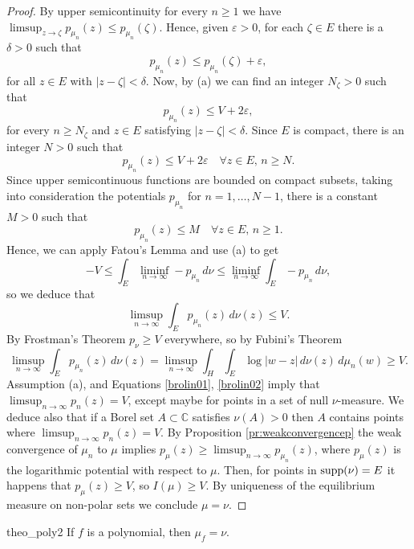 \begin{proof}

By upper semicontinuity for every $n\geq 1$ we have $\limsup_{z\rightarrow \zeta} p_{\mu_n}(z)\leq p_{\mu_n}(\zeta)$. Hence, given $\varepsilon>0$, for each $\zeta\in E$ there is a $\delta>0$ such that 
$$p_{\mu_n}(z) \leq p_{\mu_n}(\zeta)+\varepsilon,$$
for all $z\in E$ with $|z-\zeta|<\delta$. Now, by (a) we can find an integer $N_\zeta>0$ such that 
$$p_{\mu_n}(z) \leq V + 2\varepsilon,$$
for every $n\geq N_\zeta$ and $z\in E$ satisfying $|z-\zeta|<\delta$. Since $E$ is compact, there is an integer $N>0$ such that
$$p_{\mu_n}(z) \leq V + 2\varepsilon \quad \forall z\in E, \, n\geq N.$$
Since upper semicontinuous functions are bounded on compact subsets, taking into consideration the potentials $p_{\mu_n}$ for $n=1,\dots,N-1$, there is a constant $M>0$ such that
$$p_{\mu_n}(z) \leq M \quad \forall z\in E, \, n\geq 1.$$
Hence, we can apply Fatou's Lemma and use (a) to get
$$-V \leq \int_E \liminf_{n\rightarrow \infty} - p_{\mu_n}\,d\nu \leq \liminf_{n\rightarrow \infty} \int_E -p_{\mu_n}\,d\nu,$$
so we deduce that
\begin{equation}\label{brolin01}
\limsup_{n\rightarrow \infty} \int_E p_{\mu_n}(z)\,d\nu(z) \leq V.
\end{equation}
By Frostman's Theorem $p_\nu \geq V$ everywhere, so by Fubini's Theorem  
\begin{equation}\label{brolin02}
\limsup_{n\rightarrow \infty} \int_E p_{\mu_n}(z)\, d\nu(z) = \limsup_{n\rightarrow \infty} \int_H \int_E \log|w-z|\,d\nu(z) \,d\mu_n(w) \geq V.
\end{equation}
Assumption (a), and Equations \eqref{brolin01}, \eqref{brolin02} imply that $\limsup_{n\rightarrow \infty} p_n(z)=V$, except maybe for points in a set of null $\nu$-measure. We deduce also that if a Borel set $A\subset \mathbb{C}$ satisfies $\nu(A)>0$ then $A$ contains points where $\limsup_{n\rightarrow \infty} p_n(z)=V$. By Proposition \ref{pr:weakconvergencep} the weak convergence of $\mu_n$ to $\mu$ implies $p_\mu (z) \geq \limsup_{n\rightarrow \infty} p_{\mu_n}(z)$, where $p_\mu(z)$ is the logarithmic potential with respect to $\mu$. Then, for points in $\text{supp}(\nu)=E$ it happens that $p_\mu(z)\geq V$, so $I(\mu)\geq V$. By uniqueness of the equilibrium measure on non-polar sets we conclude $\mu=\nu$.
\end{proof}

\begin{mytheo}{}{theo_poly2}
If $f$ is a polynomial, then $\mu_{f}=\nu$.
\end{mytheo}

